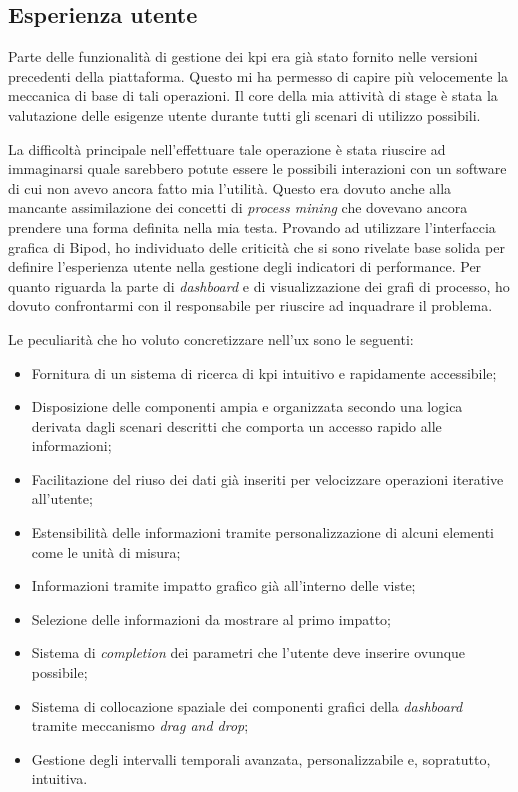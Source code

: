 \subsection{Esperienza utente}
Parte delle funzionalità di gestione dei \acrshort{kpi} era già stato fornito nelle versioni precedenti della piattaforma. Questo mi ha permesso di capire più velocemente la meccanica di base di tali operazioni. Il core della mia attività di stage è stata la valutazione delle esigenze utente durante tutti gli scenari di utilizzo possibili.

La difficoltà principale nell'effettuare tale operazione è stata riuscire ad immaginarsi quale sarebbero potute essere le possibili interazioni con un software di cui non avevo ancora fatto mia l'utilità. Questo era dovuto anche alla mancante assimilazione dei concetti di \textit{process mining} che dovevano ancora prendere una forma definita nella mia testa.
Provando ad utilizzare l'interfaccia grafica di Bipod, ho individuato delle criticità che si sono rivelate base solida per definire l'esperienza utente nella gestione degli indicatori di performance.
Per quanto riguarda la parte di \textit{dashboard} e di visualizzazione dei grafi di processo, ho dovuto confrontarmi con il responsabile per riuscire ad inquadrare il problema.

Le peculiarità che ho voluto concretizzare nell'\acrshort{ux} sono le seguenti:
\begin{itemize}
    \item Fornitura di un sistema di ricerca di \acrshort{kpi} intuitivo e rapidamente accessibile;
    \item Disposizione delle componenti ampia e organizzata secondo una logica derivata dagli scenari descritti che comporta un accesso rapido alle informazioni;
    \item Facilitazione del riuso dei dati già inseriti per velocizzare operazioni iterative all'utente;
    \item Estensibilità delle informazioni tramite personalizzazione di alcuni elementi come le unità di misura;
    \item Informazioni tramite impatto grafico già all'interno delle viste;
    \item Selezione delle informazioni da mostrare al primo impatto;
    \item Sistema di \textit{completion} dei parametri che l'utente deve inserire ovunque possibile;
    \item Sistema di collocazione spaziale dei componenti grafici della \textit{dashboard} tramite meccanismo \textit{drag and drop};
    \item Gestione degli intervalli temporali avanzata, personalizzabile e, sopratutto, intuitiva.
\end{itemize}
